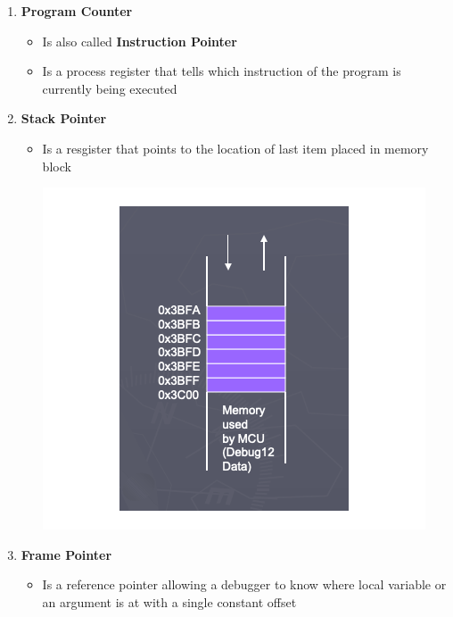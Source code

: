 \documentclass[12pt]{article}
\begin{document}
\begin{mdframed}
\begin{enumerate}[1.]
\begin{itemize}
    \end{itemize}
    \item \textbf{Program Counter}
    \begin{itemize}
        \item Is also called \textbf{Instruction Pointer}
        \item Is a process register that tells which instruction of the program
        is currently being executed
    \end{itemize}
    \item \textbf{Stack Pointer}
    \begin{itemize}
        \item Is a resgister that points to the location of last item placed in memory block

        \begin{center}
        \includegraphics[width=0.5\linewidth]{images/notes_4_2.png}
        \end{center}
    \end{itemize}
    \item \textbf{Frame Pointer}
    \begin{itemize}
        \item Is a reference pointer allowing a debugger to know where local
        variable or an argument is at with a single constant offset


\end{itemize}
\end{enumerate}
\end{mdframed}
\end{document}
